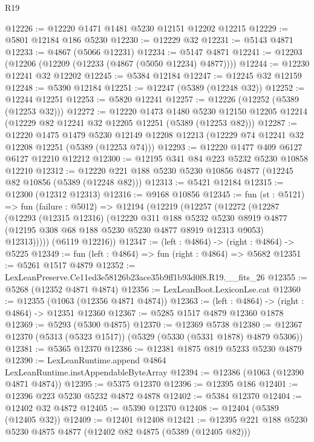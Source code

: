 \begin{lexlean}{R19}
\begin{coremodule}
@12226 := @12220 @1471 @1481 @5230 @12151 @12202 @12215
@12229 := @5801 @12184 @186 @5230
@12230 := @12229 @32
@12231 := @5143 @4871
@12233 := @4867 (@5066 @12231)
@12234 := @5147 @4871
@12241 := @12203 (@12206 (@12209 (@12233 (@4867 (@5050 @12234) @4877))))
@12244 := @12230 @12241 @32 @12202
@12245 := @5384 @12184
@12247 := @12245 @32 @12159
@12248 := @5390 @12184
@12251 := @12247 (@5389 (@12248 @32))
@12252 := @12244 @12251
@12253 := @5820 @12241
@12257 := @12226 (@12252 (@5389 (@12253 @32)))
@12272 := @12220
    @1473
    @1480
    @5230
    @12150
    @12205
    @12214
    (@12229 @82 @12241 @32 @12205 @12251 (@5389 (@12253 @82)))
@12287 := @12220
    @1475
    @1479
    @5230
    @12149
    @12208
    @12213
    (@12229 @74 @12241 @32 @12208 @12251 (@5389 (@12253 @74)))
@12293 := @12220 @1477 @409 @6127 @6127 @12210 @12212
@12300 := @12195 @341 @84 @223 @5232 @5230 @10858 @12210
@12312 := @12220 @221 @188 @5230 @5230 @10856 @4877 (@12245 @82 @10856 (@5389 (@12248 @82)))
@12313 := @5421 @12184
@12315 := @12300 (@12312 @12313)
@12316 := @9168 @10856
@12345 := fun (st : @5121) =>
  fun (failure : @5012) =>
  @12194
    (@12219
      (@12257
        (@12272
          (@12287
            (@12293
              (@12315 @12316)
              (@12220
                @311
                @188
                @5232
                @5230
                @8919
                @4877
                (@12195 @308 @68 @188 @5230 @5230 @4877 @8919 @12313 @9053)
                @12313)))))
      (@6119 @12216))
@12347 := (left : @4864) -> (right : @4864) -> @5225
@12349 := fun (left : @4864) => fun (right : @4864) => @5682
@12351 := @5261 @1517 @4879
@12352 := LexLeanPreserve.Ce11ed3e58126b23ace35b9ff1b93d0f8.R19.__fits_26
@12355 := @5268 (@12352 @4871 @4874)
@12356 := LexLeanBoot.LexiconLse.cat
@12360 := @12355 (@1063 (@12356 @4871 @4874))
@12363 := (left : @4864) -> (right : @4864) -> @12351 @12360
@12367 := @5285 @1517 @4879 @12360 @1878
@12369 := @5293 (@5300 @4875)
@12370 := @12369 @5738
@12380 := @12367 @12370 (@5313 (@5323 @1517)) (@5329 (@5330 (@5331 @1878) @4879 @5306))
@12381 := @5365 @12370
@12386 := @12381 @1875 @819 @5233 @5230 @4879
@12390 := LexLeanRuntime.append @4864 LexLeanRuntime.instAppendableByteArray
@12394 := @12386 (@1063 (@12390 @4871 @4874))
@12395 := @5375 @12370
@12396 := @12395 @186
@12401 := @12396 @223 @5230 @5232 @4872 @4878
@12402 := @5384 @12370
@12404 := @12402 @32 @4872
@12405 := @5390 @12370
@12408 := @12404 (@5389 (@12405 @32))
@12409 := @12401 @12408
@12421 := @12395 @221 @188 @5230 @5230 @4875 @4877 (@12402 @82 @4875 (@5389 (@12405 @82)))

\end{coremodule}
\end{lexlean}
